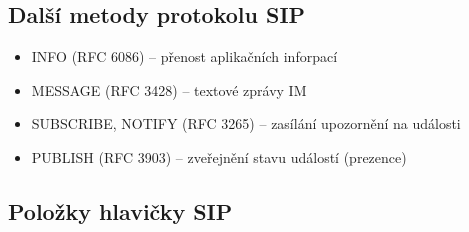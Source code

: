 \subsection*{Další metody protokolu SIP}
\begin{itemize}
    \item INFO (RFC 6086) – přenost aplikačních inforpací
    \item MESSAGE (RFC 3428) – textové zprávy IM
    \item SUBSCRIBE, NOTIFY (RFC 3265) – zasílání upozornění na události
    \item PUBLISH (RFC 3903) – zveřejnění stavu událostí (prezence)
\end{itemize}

\subsection*{Položky hlavičky SIP}
